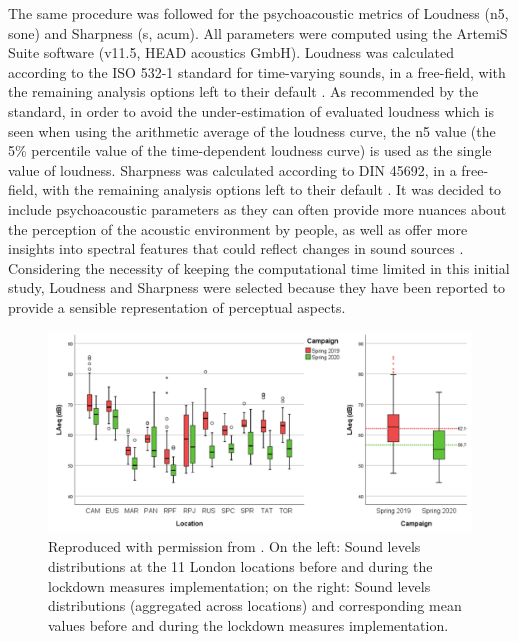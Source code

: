  The same procedure was followed for the psychoacoustic metrics of Loudness (\gls{n5}, sone) and Sharpness (\gls{s}, acum). All parameters were computed using the ArtemiS Suite software (v11.5, HEAD acoustics GmbH). Loudness was calculated according to the ISO 532-1 standard for time-varying sounds, in a free-field, with the remaining analysis options left to their default \citep{ISO532Part1}. As recommended by the standard, in order to avoid the under-estimation of evaluated loudness which is seen when using the arithmetic average of the loudness curve, the \gls{n5} value (the 5\% percentile value of the time-dependent loudness curve) is used as the single value of loudness. Sharpness was calculated according to DIN 45692, in a free-field, with the remaining analysis options left to their default . It was decided to include psychoacoustic parameters as they can often provide more nuances about the perception of the acoustic environment by people, as well as offer more insights into spectral features that could reflect changes in sound sources . Considering the necessity of keeping the computational time limited in this initial study, Loudness and Sharpness were selected because they have been reported to provide a sensible representation of perceptual aspects. 

 \begin{figure}[h]
   \centering
   \includegraphics[width=\textwidth]{Figures/NoiseMappingLockdown Fig 1.png}   
   \caption{Reproduced with permission from \citet{Aletta2020Assessing}. On the left: Sound levels distributions at the 11 London locations before and during the lockdown measures implementation; on the right: Sound levels distributions (aggregated across locations) and corresponding mean values before and during the lockdown measures implementation. \label{fig:NsMapLockLAeq}}

   
  \end{figure}

